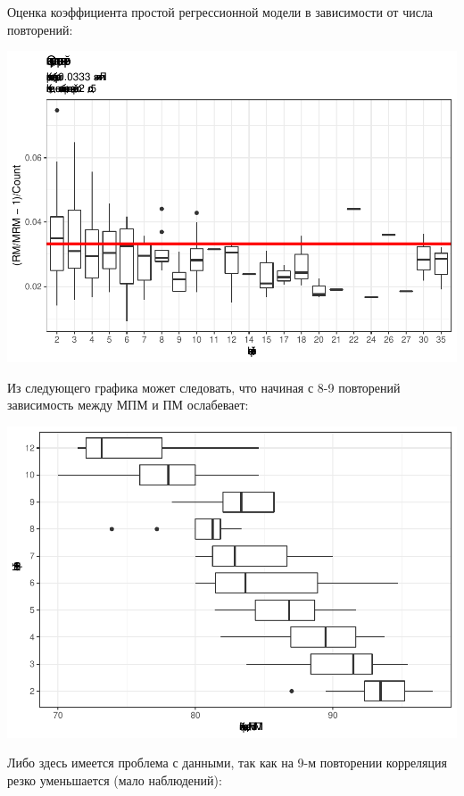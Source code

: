 \documentclass[
]{article}
\begin{document}
Оценка коэффициента простой регрессионной модели в зависимости от числа
повторений:

\begin{center}\includegraphics[width=0.9\linewidth]{Regression-model-for-estimating-RM_files/figure-latex/unnamed-chunk-15-1} \end{center}

Из следующего графика может следовать, что начиная с 8-9 повторений
зависимость между МПМ и ПМ ослабевает:

\begin{center}\includegraphics{Regression-model-for-estimating-RM_files/figure-latex/unnamed-chunk-16-1} \end{center}

Либо здесь имеется проблема с данными, так как на 9-м повторении
корреляция резко уменьшается (мало наблюдений):
\end{document}
